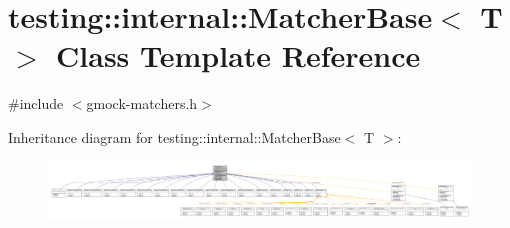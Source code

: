 \hypertarget{classtesting_1_1internal_1_1MatcherBase}{}\section{testing\+:\+:internal\+:\+:Matcher\+Base$<$ T $>$ Class Template Reference}
\label{classtesting_1_1internal_1_1MatcherBase}


{\ttfamily \#include $<$gmock-\/matchers.\+h$>$}



Inheritance diagram for testing\+:\+:internal\+:\+:Matcher\+Base$<$ T $>$\+:
\nopagebreak
\begin{figure}[H]
\begin{center}
\leavevmode
\includegraphics[width=350pt]{classtesting_1_1internal_1_1MatcherBase__inherit__graph}
\end{center}
\end{figure}


